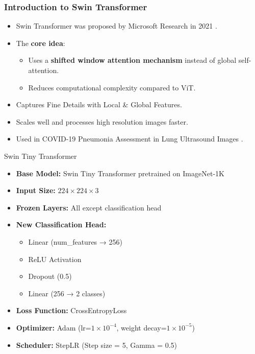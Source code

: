 \documentclass{beamer}
\begin{document}
\begin{frame}
    \frametitle{Introduction to Swin Transformer}

    \begin{itemize}
        \item Swin Transformer was proposed by Microsoft Research in 2021 \cite{swin}.
\item The \textbf{core idea}:
        \begin{itemize}
            \item Uses a \textbf{shifted window attention mechanism} instead of global self-attention.
            \item Reduces computational complexity compared to ViT.
	\end{itemize}
            \item Captures Fine Details with Local \& Global Features.
            \item Scales well and processes high resolution images faster.
            \item Used in COVID-19 Pneumonia Assessment in Lung Ultrasound Images \cite{swin-lus}.
    \end{itemize}

\end{frame}

\begin{frame}{Swin Tiny Transformer}
\begin{itemize}
    \item \textbf{Base Model:} Swin Tiny Transformer pretrained on ImageNet-1K \\
    \item \textbf{Input Size:} \(224 \times 224 \times 3\) \\
    \item\textbf{Frozen Layers:} All except classification head \\
    \item \textbf{New Classification Head:}
    \begin{itemize}
        \item Linear (num\_features → 256)
        \item ReLU Activation
        \item Dropout (0.5)
        \item Linear (256 → 2 classes)
    \end{itemize}
        \item \textbf{Loss Function:} CrossEntropyLoss
        \item \textbf{Optimizer:} Adam (lr=$1 \times 10^{-4}$, weight decay=$1 \times 10^{-5}$)
        \item \textbf{Scheduler:} StepLR (Step size = 5, Gamma = 0.5)
    \end{itemize}
\end{frame}
\end{document}
